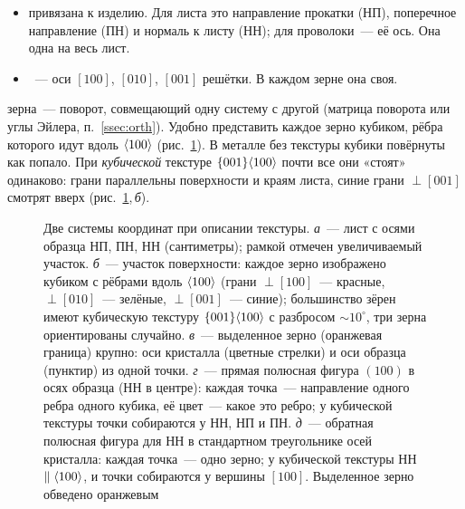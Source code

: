 \begin{itemize}
\item {} привязана к изделию. Для листа это
направление прокатки (НП), поперечное направление (ПН) и нормаль к
листу (НН); для проволоки~— её ось. Она одна на весь лист.
\item {}~— оси $[100]$, $[010]$, $[001]$
решётки. В каждом зерне она своя.
\end{itemize}
 зерна~— поворот, совмещающий одну систему с другой
(матрица поворота или углы Эйлера, п.~\ref{ssec:orth}). Удобно представить
каждое зерно кубиком, рёбра которого идут вдоль $\langle 100\rangle$
(рис.~\ref{fig:texture-frames}). В металле без текстуры кубики повёрнуты
как попало. При \emph{кубической} текстуре $\{001\}\langle 100\rangle$ почти все
они «стоят» одинаково: грани параллельны поверхности и краям листа,
синие грани $\perp[001]$ смотрят вверх (рис.~\ref{fig:texture-frames},\,\textit{б}).

\begin{figure}[p]
\centering
{}
\caption{Две системы координат при описании текстуры. \textit{а}~—
лист с осями образца НП, ПН, НН (сантиметры); рамкой отмечен
увеличиваемый участок. \textit{б}~— участок поверхности: каждое зерно
изображено кубиком с рёбрами вдоль $\langle 100\rangle$ (грани $\perp[100]$~—
красные, $\perp[010]$~— зелёные, $\perp[001]$~— синие); большинство зёрен
имеют кубическую текстуру $\{001\}\langle 100\rangle$ с разбросом
$\sim10^\circ$, три зерна ориентированы случайно. \textit{в}~— выделенное
зерно (оранжевая граница) крупно: оси кристалла (цветные стрелки) и оси
образца (пунктир) из одной точки. \textit{г}~— прямая полюсная фигура
$(100)$ в осях образца (НН в центре): каждая точка~— направление одного
ребра одного кубика, её цвет~— какое это ребро; у кубической текстуры
точки собираются у НН, НП и ПН. \textit{д}~— обратная полюсная фигура
для НН в стандартном треугольнике осей кристалла: каждая точка~— одно
зерно; у кубической текстуры НН $\parallel\langle 100\rangle$, и точки собираются у
вершины $[100]$. Выделенное зерно обведено оранжевым}
\label{fig:texture-frames}
\end{figure}

